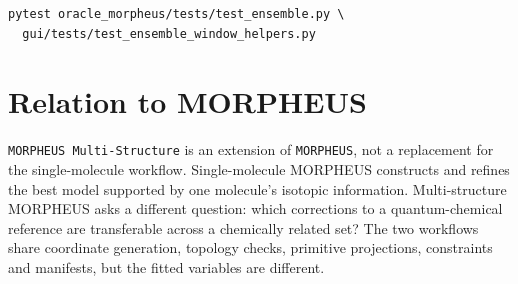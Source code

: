 \documentclass[11pt]{article}
\newcommand{\program}{\texttt{MORPHEUS Multi-Structure}}
\newcommand{\morpheus}{\texttt{MORPHEUS}}
\begin{document}
\begin{lstlisting}[style=oracle]
pytest oracle_morpheus/tests/test_ensemble.py \
  gui/tests/test_ensemble_window_helpers.py
\end{lstlisting}

\section{Relation to MORPHEUS}

\program{} is an extension of \morpheus{}, not a replacement for the
single-molecule workflow.  Single-molecule MORPHEUS constructs and refines the
best model supported by one molecule's isotopic information.  Multi-structure
MORPHEUS asks a different question: which corrections to a quantum-chemical
reference are transferable across a chemically related set?  The two workflows
share coordinate generation, topology checks, primitive projections,
constraints and manifests, but the fitted variables are different.
\end{document}

